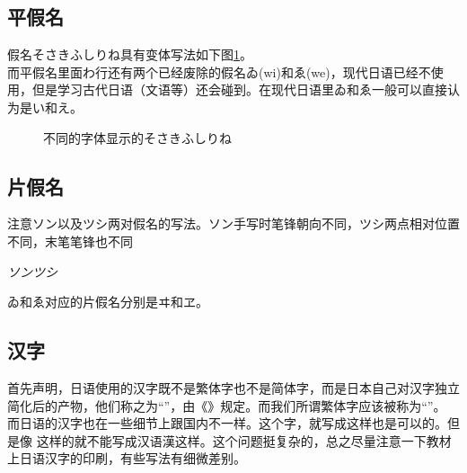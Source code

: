 \documentclass[12pt, a4paper, oneside]{book}
\newcommand{\jp}{\CJKfamily{zj}}
\begin{document}
\subsection{平假名}
假名そさきふしりね具有变体写法如下图\ref{tab:dif}。\\
而平假名里面わ行还有两个已经废除的假名ゐ(wi)和ゑ(we)，现代日语已经不使用，但是学习古代日语（文语等）还会碰到。在现代日语里ゐ和ゑ一般可以直接认为是い和え。
\begin{figure}[htbp]
\centering
{}
\quad
{}
\quad
{}
\quad
{}
\caption{不同的字体显示的そさきふしりね}
\label{tab:dif}
\end{figure}
\subsection{片假名}
注意ソン以及ツシ两对假名的写法。ソン手写时笔锋朝向不同，ツシ两点相对位置不同，末笔笔锋也不同
\begin{center}
    \textit{\Huge ソンツシ} 
\end{center}
ゐ和ゑ对应的片假名分别是ヰ和ヱ。
\subsection{汉字}
首先声明，日语使用的汉字既不是繁体字也不是简体字，而是日本自己对汉字独立简化后的产物，他们称之为``{\jp {}}''，由《{\jp {}}》规定。而我们所谓繁体字应该被称为``{\jp {}}''。\\
而日语的汉字也在一些细节上跟国内不一样。{\jp \color{red}}这个字，就写成{\color{red}}这样也是可以的。但是像{\jp \color{red} }这样的就不能写成汉语{\color{red}漢}这样。这个问题挺复杂的，总之尽量注意一下教材上日语汉字的印刷，有些写法有细微差别。
\end{document}
